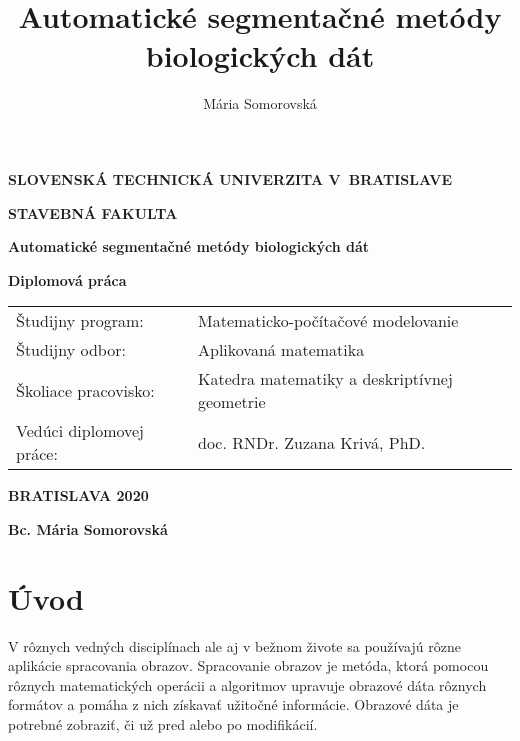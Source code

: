 \documentclass[a4paper,11pt,twoside]{article}%
\author{Mária Somorovská}
\title{Automatické segmentačné metódy biologických dát}
\begin{document}
\setlength{\belowdisplayskip}{7pt} \setlength{\belowdisplayshortskip}{5pt}
\setlength{\abovedisplayskip}{7pt} \setlength{\abovedisplayshortskip}{5pt}

    \thispagestyle{empty}
    {
    \topmargin=0pt
    \centerline {\large \bf{SLOVENSKÁ TECHNICKÁ UNIVERZITA V~BRATISLAVE}}
    \vskip 0.2cm
    \centerline{\large \bf{STAVEBNÁ FAKULTA}}
    \vskip 7cm
    \centerline{\Large \bf{Automatické segmentačné metódy biologických dát}}
    \vskip 0.2cm
    \vskip 0.5cm
    \centerline{\large \bf{Diplomová práca}}
    \vskip 5cm          %
    \normalsize
        \begin{tabular}[l]{p{}p{}}
        Študijny program: & Matematicko-počítačové modelovanie\\
        Študijny odbor: & Aplikovaná matematika\\
        Školiace pracovisko: & Katedra matematiky a deskriptívnej geometrie\\
        Vedúci diplomovej práce: & doc. RNDr. Zuzana Krivá, PhD. \\
        \end{tabular}
    \vskip 1.5cm
    \centerline{\large \bf{BRATISLAVA 2020}}
    \vskip 0.2cm
    \centerline{\large \bf{Bc. Mária Somorovská}}
    }
\pagebreak

\tableofcontents

\newpage

\section{Úvod}



V rôznych vedných disciplínach ale aj v bežnom živote sa používajú rôzne aplikácie spracovania obrazov. Spracovanie obrazov je metóda, ktorá pomocou rôznych matematických operácii a algoritmov upravuje obrazové dáta rôznych formátov a pomáha z nich získavať užitočné informácie. Obrazové dáta je potrebné zobraziť, či už pred alebo po modifikácií. 
\end{document}

